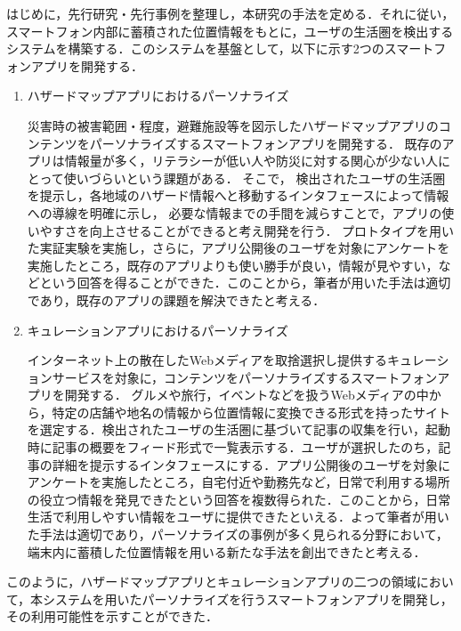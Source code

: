 \documentclass[a4paper]{jsarticle}
\begin{document}
はじめに，先行研究・先行事例を整理し，本研究の手法を定める．それに従い，スマートフォン内部に蓄積された位置情報をもとに，ユーザの生活圏を検出するシステムを構築する．このシステムを基盤として，以下に示す2つのスマートフォンアプリを開発する．
\begin{enumerate}
  \item ハザードマップアプリにおけるパーソナライズ

  災害時の被害範囲・程度，避難施設等を図示したハザードマップアプリのコンテンツをパーソナライズするスマートフォンアプリを開発する．
  既存のアプリは情報量が多く，リテラシーが低い人や防災に対する関心が少ない人にとって使いづらいという課題がある．
  そこで，
  検出されたユーザの生活圏を提示し，各地域のハザード情報へと移動するインタフェースによって情報への導線を明確に示し，
  必要な情報までの手間を減らすことで，アプリの使いやすさを向上させることができると考え開発を行う．
  プロトタイプを用いた実証実験を実施し，さらに，アプリ公開後のユーザを対象にアンケートを実施したところ，既存のアプリよりも使い勝手が良い，情報が見やすい，などという回答を得ることができた．このことから，筆者が用いた手法は適切であり，既存のアプリの課題を解決できたと考える．

  \item キュレーションアプリにおけるパーソナライズ

  インターネット上の散在したWebメディアを取捨選択し提供するキュレーションサービスを対象に，コンテンツをパーソナライズするスマートフォンアプリを開発する．
  グルメや旅行，イベントなどを扱うWebメディアの中から，特定の店舗や地名の情報から位置情報に変換できる形式を持ったサイトを選定する．検出されたユーザの生活圏に基づいて記事の収集を行い，起動時に記事の概要をフィード形式で一覧表示する．ユーザが選択したのち，記事の詳細を提示するインタフェースにする．アプリ公開後のユーザを対象にアンケートを実施したところ，自宅付近や勤務先など，日常で利用する場所の役立つ情報を発見できたという回答を複数得られた．このことから，日常生活で利用しやすい情報をユーザに提供できたといえる．よって筆者が用いた手法は適切であり，パーソナライズの事例が多く見られる分野において，端末内に蓄積した位置情報を用いる新たな手法を創出できたと考える．
\end{enumerate}

このように，ハザードマップアプリとキュレーションアプリの二つの領域において，本システムを用いたパーソナライズを行うスマートフォンアプリを開発し，その利用可能性を示すことができた．
\end{document}
